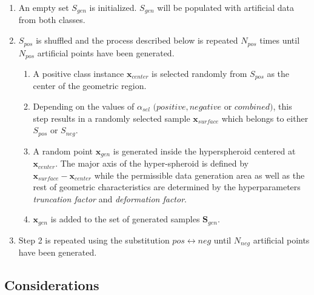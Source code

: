\documentclass[parskip=full]{scrartcl}
\begin{document}
\begin{enumerate}

\renewcommand{\labelenumii}{\theenumii}
\renewcommand{\theenumii}{\theenumi.\arabic{enumii}.}

	\item An empty set \( S_{gen} \) is initialized. \( S_{gen} \) will be populated with artificial data from both classes.

	\item \( S_{pos} \) is shuffled and the process described below is repeated \( N_{pos} \) times until \( N_{pos} \) artificial points have been generated.

	\begin{enumerate}

		\item A positive class instance \( \textbf{x}_{center} \) is selected randomly from \( S_{pos} \) as the center of the geometric region.

		\item Depending on the values of \( \alpha_{sel} \) \( (positive, negative \) or \( combined) \), this step results in a randomly selected sample \(\textbf{x}_{surface} \) which belongs to either \( S_{pos} \) or \( S_{neg} \).

		\item A random point \(\textbf{x}_{gen} \) is generated inside the hyperspheroid centered at \( \textbf{x}_{center} \). The major axis of the hyper-spheroid is defined by \( \textbf{x}_{surface} - \textbf{x}_{center} \) while the permissible data generation area as well as the rest of geometric characteristics are determined by the hyperparameters \textit{truncation factor} and \textit{deformation factor}.

		\item \( \textbf{x}_{gen} \) is added to the set of generated samples
		\( \textbf{S}_{gen} \).
	
	\end{enumerate}

	\item Step 2 is repeated using the substitution \( pos \leftrightarrow neg \) until \( N_{neg} \) artificial points have been generated.

\end{enumerate}

\subsection{Considerations}
\end{document}
